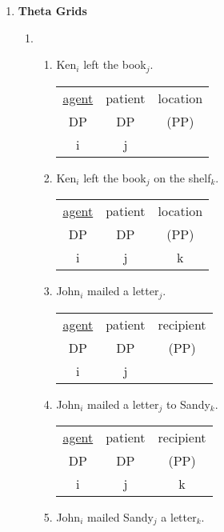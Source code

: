 \documentclass[12pt]{article}
\begin{document}
\begin{enumerate}[label=\textbf{\arabic*.}]
\begin{enumerate}[label=(\alph*)]
{}

\end{enumerate}

\pagebreak
\item \textbf{Theta Grids}

\begin{enumerate}[label=(\arabic*)]
\item
\begin{enumerate}[label=\alph*.]
\item Ken$_{i}$ left the book$_{j}$.\\
\begin{tabular}{ |c|c|c| } 
 \hline
 \underline{agent} & patient & location \\ 
 DP & DP & (PP) \\ 
 \hline
 i & j & \\ 
 \hline
\end{tabular}
\item Ken$_{i}$ left the book$_{j}$ on the shelf$_{k}$.\\
\begin{tabular}{ |c|c|c| } 
 \hline
 \underline{agent} & patient & location \\ 
 DP & DP & (PP) \\ 
 \hline
 i & j & k \\ 
 \hline
\end{tabular}
\item John$_{i}$ mailed a letter$_{j}$.\\
\begin{tabular}{ |c|c|c| } 
 \hline
 \underline{agent} & patient & recipient \\ 
 DP & DP & (PP) \\ 
 \hline
 i & j &  \\ 
 \hline
\end{tabular}
\item John$_{i}$ mailed a letter$_{j}$ to Sandy$_{k}$.\\
\begin{tabular}{ |c|c|c| } 
 \hline
 \underline{agent} & patient & recipient \\ 
 DP & DP & (PP) \\ 
 \hline
 i & j & k \\ 
 \hline
\end{tabular}
\item John$_{i}$  mailed Sandy$_{j}$ a letter$_{k}$.\\

\end{enumerate}
\end{enumerate}
\end{enumerate}
\end{document}
